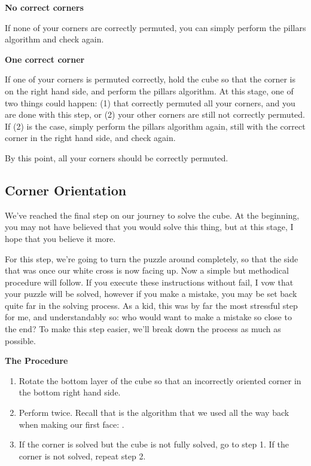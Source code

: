 \documentclass[12pt,letterpaper]{article}
\newcommand{\alg}[1]{
  \tcbox{
    {\tt #1}
  }
}
\begin{document}
{\bf No correct corners}

If none of your corners are correctly permuted, you can simply perform the
pillars algorithm and check again.

{\bf One correct corner}

If one of your corners is permuted correctly, hold the cube so that the corner
is on the right hand side, and perform the pillars algorithm. At this stage, one
of two things could happen: (1) that correctly permuted all your corners, and
you are done with this step, or (2) your other corners are still not correctly
permuted. If (2) is the case, simply perform the pillars algorithm again, still
with the correct corner in the right hand side, and check again.

By this point, all your corners should be correctly permuted.

\subsection{Corner Orientation}

We've reached the final step on our journey to solve the cube. At the
beginning, you may not have believed that you would solve this thing, but at
this stage, I hope that you believe it more.


For this step, we're going to turn the puzzle around completely, so that the
side that was once our white cross is now facing up. Now a simple but methodical
procedure will follow. If you execute these instructions without fail, I vow
that your puzzle will be solved, however if you make a mistake, you may be set
back quite far in the solving process. As a kid, this was by far the most
stressful step for me, and understandably so: who would want to make a mistake so
close to the end? To make this step easier, we'll break down the process as
much as possible.

{\bf The Procedure}

\begin{enumerate}
  \item Rotate the bottom layer of the cube so that an incorrectly oriented
    corner in the bottom right hand side.
  \item Perform \alg{[sexy]} twice. Recall that \alg{[sexy]} is the algorithm
    that we used all the way back when making our first face: \alg{R U R' U'}.
  \item If the corner is solved but the cube is not fully solved, go to step 1.
    If the corner is not solved, repeat step 2.
\end{enumerate}
\end{document}
